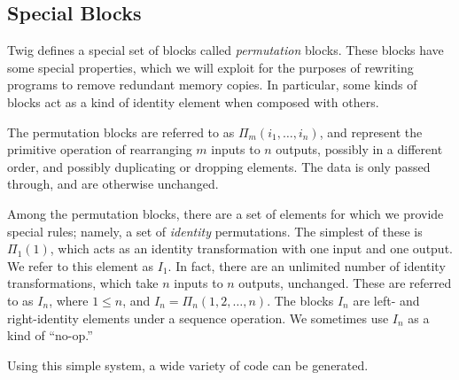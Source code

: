 \subsection{Special Blocks}

Twig defines a special set of blocks called \emph{permutation} blocks. These
blocks have some special properties, which we will exploit for the purposes of
rewriting programs to remove redundant memory copies. In particular, some kinds
of blocks act as a kind of identity element when composed with others.

The permutation blocks are referred to as $\Pi_m(i_1,\ldots,i_n)$, and represent
the primitive operation of rearranging $m$ inputs to $n$ outputs, possibly in a
different order, and possibly duplicating or dropping elements. The data is only
passed through, and are otherwise unchanged.

Among the permutation blocks, there are a set of elements for which we provide
special rules; namely, a set of \emph{identity} permutations. The simplest of
these is $\Pi_1(1)$, which acts as an identity transformation with one input and
one output. We refer to this element as $I_1$. In fact, there are an unlimited
number of identity transformations, which take $n$ inputs to $n$ outputs,
unchanged. These are referred to as $I_n$, where $1 \leq n$, and $I_n =
\Pi_n(1,2,\ldots,n)$. The blocks $I_n$ are left- and right-identity elements
under a sequence operation. We sometimes use $I_n$ as a kind of ``no-op.''

Using this simple system, a wide variety of code can be generated.


